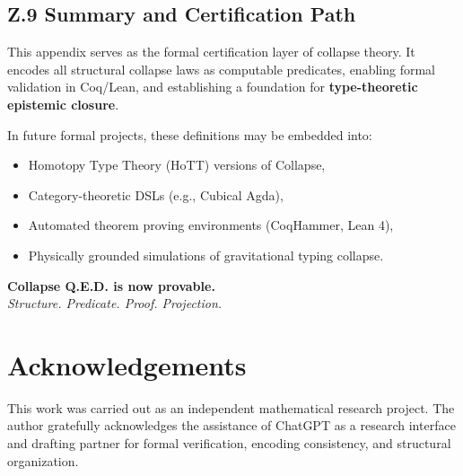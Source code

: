 \documentclass[11pt]{article}
\begin{document}
\subsection*{Z.9 Summary and Certification Path}

This appendix serves as the formal certification layer of collapse theory. It encodes all structural collapse laws as computable predicates, enabling formal validation in Coq/Lean, and establishing a foundation for \textbf{type-theoretic epistemic closure}.

In future formal projects, these definitions may be embedded into:

\begin{itemize}
  \item Homotopy Type Theory (HoTT) versions of Collapse,
  \item Category-theoretic DSLs (e.g., Cubical Agda),
  \item Automated theorem proving environments (CoqHammer, Lean 4),
  \item Physically grounded simulations of gravitational typing collapse.
\end{itemize}

\begin{center}
\textbf{Collapse Q.E.D. is now provable.}\\
\textit{Structure. Predicate. Proof. Projection.}
\end{center}



\section*{Acknowledgements}

This work was carried out as an independent mathematical research project. The author gratefully acknowledges the assistance of ChatGPT as a research interface and drafting partner for formal verification, encoding consistency, and structural organization.
\end{document}
